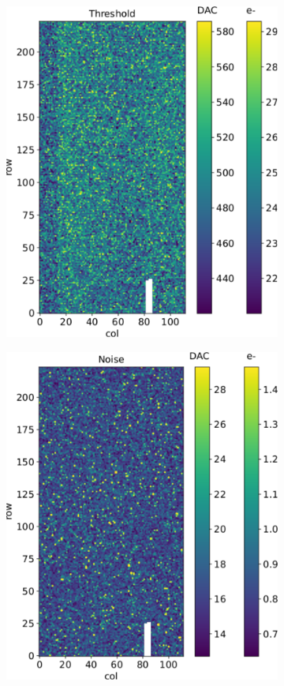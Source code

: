         \begin{figure}[h!]
            \begin{subfigure}{.5\textwidth}
            \centering
            \includegraphics[width=.9\linewidth]{figures/charaterization/threshold_map.pdf}
            \end{subfigure}
            \begin{subfigure}{.5\textwidth}
            \centering
            \includegraphics[width=.9\linewidth]{figures/charaterization/noise_map.pdf}

\end{subfigure}
\end{figure}
